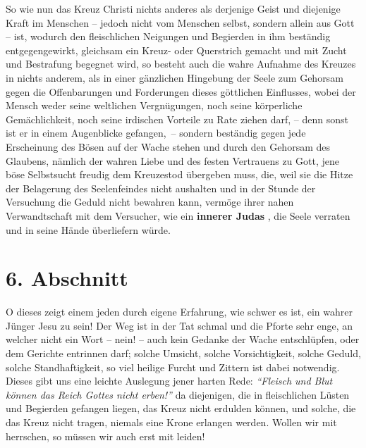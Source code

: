 \medskip

So wie nun das Kreuz Christi nichts anderes als derjenige Geist und diejenige
Kraft im Menschen -- jedoch nicht vom Menschen selbst, sondern allein aus Gott
--
ist, wodurch den fleischlichen Neigungen und Begierden in ihm beständig
entgegengewirkt, gleichsam ein Kreuz- oder Querstrich gemacht und mit Zucht und
Bestrafung begegnet wird, so besteht auch die wahre Aufnahme des Kreuzes in
nichts anderem, als in einer gänzlichen Hingebung der Seele zum Gehorsam gegen
die Offenbarungen und Forderungen dieses göttlichen Einflusses, wobei der Mensch
weder seine weltlichen Vergnügungen, noch seine
körperliche
Gemächlichkeit,
noch seine irdischen Vorteile zu Rate ziehen darf, -- denn sonst ist er in
einem Augenblicke gefangen,~-- sondern beständig gegen jede Erscheinung des
Bösen auf der Wache stehen und durch den Gehorsam des Glaubens, nämlich der
wahren Liebe und des festen Vertrauens zu Gott, jene böse Selbstsucht freudig
dem Kreuzestod übergeben muss, die, weil sie die Hitze der Belagerung des
Seelenfeindes nicht aushalten und in der Stunde der Versuchung die Geduld nicht
bewahren kann, vermöge ihrer nahen Verwandtschaft mit dem Versucher, wie ein
\textbf{innerer Judas}
, die Seele verraten und in seine Hände überliefern würde.



\section{6. Abschnitt} \label{kap3_ab6}

O dieses zeigt einem jeden durch eigene Erfahrung, wie schwer es ist, ein wahrer
Jünger Jesu zu sein! Der Weg ist in der Tat schmal und die Pforte sehr enge, an
welcher nicht ein Wort -- nein! -- auch kein Gedanke der Wache entschlüpfen,
oder
dem Gerichte entrinnen darf;
solche Umsicht, solche Vorsichtigkeit, solche Geduld,
solche Standhaftigkeit, so viel heilige Furcht und Zittern ist dabei notwendig.
Dieses gibt uns eine leichte Auslegung jener harten Rede:
\textit{"`Fleisch und Blut können das Reich Gottes nicht erben!"'}
da diejenigen, die in fleischlichen
Lüsten und Begierden gefangen liegen, das Kreuz nicht erdulden können, und
solche, die das Kreuz nicht tragen, niemals eine Krone erlangen werden. Wollen
wir mit herrschen, so müssen wir auch erst mit leiden!




